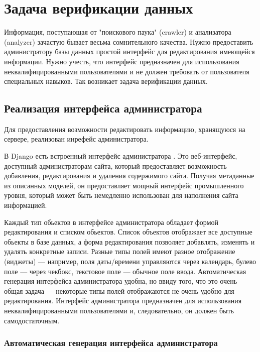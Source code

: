 \section{Задача верификации данных}

Информация, поступающая от "поискового паука" (crawler) и анализатора (analyzer) зачастую бывает весьма сомнительного качества. Нужно предоставить администратору базы данных простой интерфейс для редактирования имеющейся информации. Нужно учесть, что интерфейс предназначен для использования неквалифицированными пользователями и не должен требовать от пользователя специальных навыков. Так возникает задача верификации данных.

\subsection{Реализация интерфейса администратора}

Для предоставления возможности редактировать информацию, хранящуюся на сервере, реализован инрефейс администратора.

В Django есть встроенный интерфейс администратора \cite{doc-admin, djbook-admin}. Это веб-интерфейс, доступный администраторам сайта, который предоставляет возможность добавления, редактирования и удаления содержимого сайта. Получая метаданные из описанных моделей, он предоставляет мощный интерфейс промышленного уровня, который может быть немедленно использован для наполнения сайта информацией.

Каждый тип обьектов в интерфейсе администратора обладает формой редактирования и списком обьектов. Список объектов отображает все доступные обьекты в базе данных, а форма редактирования позволяет добавлять, изменять и удалять конкретные записи. 
Разные типы полей имеют разное отображение (виджеты) --- например, поля даты/времени управляются через календарь, булево поле --- через чекбокс, текстовое поле --- обычное поле ввода. 
Автоматическая генерация интерфейса администратора удобна, но ввиду того, что это очень общая задача --- некоторые типы полей отображаются не очень удобно для редактирования. Интерфейс администратора предназначен для использования неквалифицированными пользователями и, следовательно, он должен быть самодостаточным.

\subsubsection{Автоматическая генерация интерфейса администратора}

